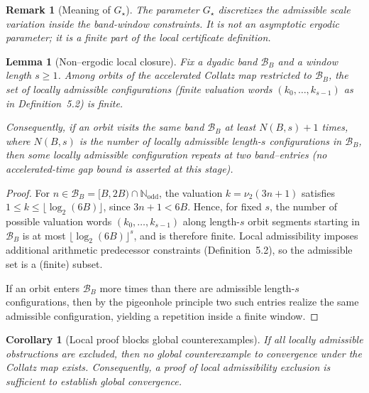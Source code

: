 \documentclass[preprint,12pt]{elsarticle}
\newtheorem{remark}{Remark}
\newtheorem{lemma}{Lemma}
\newtheorem{corollary}{Corollary}
\begin{document}
\begin{remark}[Meaning of $G_\star$]
\label{rem:Gstar_meaning}
The parameter $G_\star$ discretizes the admissible scale variation inside the band-window constraints.
It is not an asymptotic ergodic parameter; it is a finite part of the local certificate definition.
\end{remark}

\begin{lemma}[Non--ergodic local closure]
\label{lem:nonergodic-local-closure}
Fix a dyadic band \(\mathcal{B}_B\) and a window length \(s\ge 1\).
Among orbits of the accelerated Collatz map restricted to \(\mathcal{B}_B\),
the set of \emph{locally admissible configurations} (finite valuation words
\((k_0,\dots,k_{s-1})\) as in Definition~5.2) is finite.

Consequently, if an orbit visits the same band \(\mathcal{B}_B\) at least
\(N(B,s)+1\) times, where \(N(B,s)\) is the number of locally admissible
length-\(s\) configurations in \(\mathcal{B}_B\), then some locally admissible
configuration repeats at two band--entries (no accelerated-time gap bound is asserted at this stage).
\end{lemma}

\begin{proof}
For \(n\in\mathcal{B}_B=[B,2B)\cap\mathbb{N}_{\mathrm{odd}}\), the valuation
\(k=\nu_2(3n+1)\) satisfies \(1\le k \le \lfloor \log_2(6B)\rfloor\), since
\(3n+1<6B\). Hence, for fixed \(s\), the number of possible valuation words
\((k_0,\dots,k_{s-1})\) along length-\(s\) orbit segments starting in
\(\mathcal{B}_B\) is at most \(\lfloor \log_2(6B)\rfloor^s\), and is therefore
finite. Local admissibility imposes additional arithmetic predecessor
constraints (Definition~5.2), so the admissible set is a (finite) subset.

If an orbit enters \(\mathcal{B}_B\) more times than there are admissible
length-\(s\) configurations, then by the pigeonhole principle two such entries
realize the same admissible configuration, yielding a repetition inside a
finite window.
\end{proof}



\begin{corollary}[Local proof blocks global counterexamples]
\label{cor:local-blocks-global}
If all locally admissible obstructions are excluded, then no global
counterexample to convergence under the Collatz map exists.
Consequently, a proof of local admissibility exclusion is sufficient to
establish global convergence.
\end{corollary}
\end{document}
